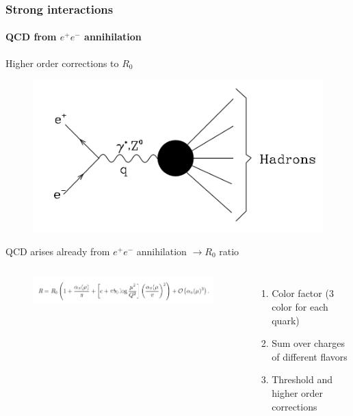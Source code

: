 \documentclass[aspectratio=43]{beamer}
\begin{document}
\begin{frame}

	\frametitle{Strong interactions}
	\framesubtitle{QCD from $e^{+}e^{-}$ annihilation}
	
	Higher order corrections to $R_{0}$ 
	\begin{figure}
		\includegraphics[width = 5 cm]{plots/ee_hadrons.png}
	\end{figure}
	
	QCD arises already from $e^{+}e^{-}$ annihilation $\rightarrow R_{0}$ ratio
	
	\begin{columns}
		
		
		\begin{figure}
			\includegraphics[width = 6 cm]{plots/eq_R0_3.png}
		\end{figure}
		
		
		\begin{enumerate}
			\item \footnotesize Color factor (3 color for each quark)
			\item \footnotesize Sum over charges of different flavors
			\item \footnotesize Threshold and higher order corrections
		\end{enumerate}	
		
	\end{columns}

\end{frame}
\end{document}
